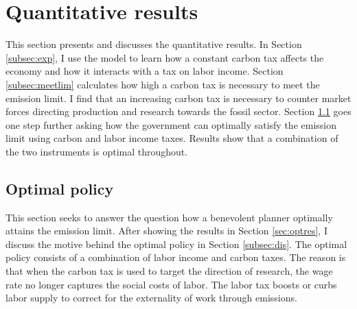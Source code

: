 \section{Quantitative results}\label{sec:res}

This section presents and discusses the quantitative results. 
In Section \ref{subsec:exp}, I use the model to learn how a constant carbon tax affects the economy and how it interacts with a tax on labor income. Section \ref{subsec:meetlim} calculates how high a carbon tax is necessary to meet the emission limit. I find that an increasing carbon tax is necessary to counter market forces directing production and research towards the fossil sector. 
Section \ref{subsec:mr} goes one step further asking  how the government can optimally satisfy the emission limit using carbon and labor income taxes. Results show that a combination of the two instruments is optimal throughout. 





\subsection{Optimal policy}\label{subsec:mr}


This section seeks to answer the question how a benevolent planner optimally attains the emission limit. After showing the results in Section \ref{sec:optres}, I discuss the motive behind the optimal policy in Section \ref{subsec:dis}. The optimal policy consists of a combination of labor income and carbon taxes. The reason is that when the carbon tax is used to target the direction of research, the wage rate no longer captures the social costs of labor. The labor tax boosts or curbs labor supply to correct for the externality of work through emissions. 

